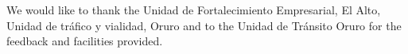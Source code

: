 \documentclass[fleqn,12pt]{SelfArx} %
\begin{document}

We would like to thank the Unidad de Fortalecimiento Empresarial, El Alto, Unidad de tráfico y vialidad, Oruro and to the Unidad de Tránsito Oruro for the feedback and facilities provided.




\end{document}

